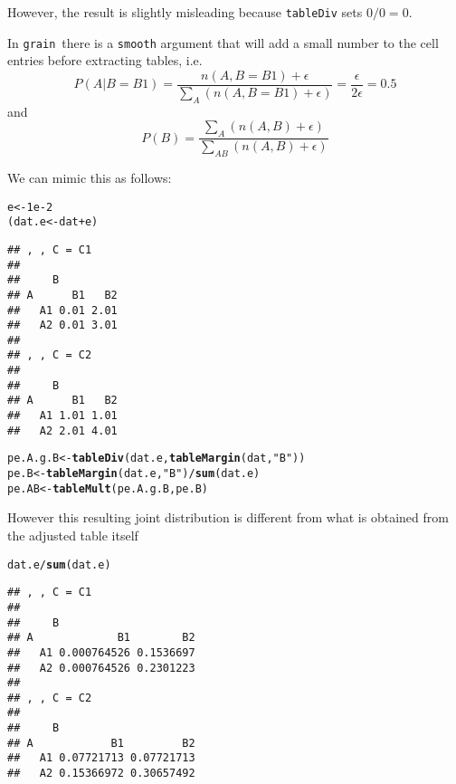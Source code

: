 \documentclass[10pt]{article}\usepackage[]{graphicx}\usepackage[]{color}
\makeatletter
\newcommand{\hlnum}[1]{\textcolor[rgb]{0.686,0.059,0.569}{#1}}%
\newcommand{\hlstr}[1]{\textcolor[rgb]{0.192,0.494,0.8}{#1}}%
\newcommand{\hlopt}[1]{\textcolor[rgb]{0,0,0}{#1}}%
\newcommand{\hlstd}[1]{\textcolor[rgb]{0.345,0.345,0.345}{#1}}%
\newcommand{\hlkwb}[1]{\textcolor[rgb]{0.69,0.353,0.396}{#1}}%
\newcommand{\hlkwd}[1]{\textcolor[rgb]{0.737,0.353,0.396}{\textbf{#1}}}%
\newenvironment{kframe}{%
 \def\at@end@of@kframe{}%
 \ifinner\ifhmode%
  \def\at@end@of@kframe{\end{minipage}}%
  \begin{minipage}{\columnwidth}%
 \fi\fi%
 \def\FrameCommand##1{\hskip\@totalleftmargin \hskip-\fboxsep
 \colorbox{shadecolor}{##1}\hskip-\fboxsep
     \hskip-\linewidth \hskip-\@totalleftmargin \hskip\columnwidth}%
 \MakeFramed {\advance\hsize-\width
   \@totalleftmargin\z@ \linewidth\hsize
   \@setminipage}}%
 {\par\unskip\endMakeFramed%
 \at@end@of@kframe}
\newenvironment{knitrout}{}{} %
\def\grain{\texttt{grain}}
\def\code#1{{\texttt{#1}}}
\makeatother
\begin{document}
However, the result is slightly misleading because \code{tableDiv}
sets $0/0=0$.

In \grain\ there is a \code{smooth} argument that will add a small
number to the cell entries before extracting tables, i.e.
\begin{displaymath}
  P(A|B=B1)=\frac{n(A,B=B1)+\epsilon}{\sum_A ( n(A,B=B1) + \epsilon) }
  = \frac{\epsilon}{2\epsilon} = 0.5
\end{displaymath}
and
\begin{displaymath}
  P(B)= \frac{\sum_A (n(A,B)+\epsilon)}{\sum_{AB} (n(A,B)+\epsilon)}
\end{displaymath}

We can mimic this as follows:
\begin{knitrout}
\color{fgcolor}\begin{kframe}
\begin{alltt}
\hlstd{e} \hlkwb{<-} \hlnum{1e-2}
\hlstd{(dat.e} \hlkwb{<-} \hlstd{dat} \hlopt{+} \hlstd{e)}
\end{alltt}
\begin{verbatim}
## , , C = C1
## 
##     B
## A      B1   B2
##   A1 0.01 2.01
##   A2 0.01 3.01
## 
## , , C = C2
## 
##     B
## A      B1   B2
##   A1 1.01 1.01
##   A2 2.01 4.01
\end{verbatim}
\end{kframe}
\end{knitrout}

\begin{knitrout}
\color{fgcolor}\begin{kframe}
\begin{alltt}
\hlstd{pe.A.g.B} \hlkwb{<-} \hlkwd{tableDiv}\hlstd{(dat.e,} \hlkwd{tableMargin}\hlstd{(dat,} \hlstr{"B"}\hlstd{))}
\hlstd{pe.B} \hlkwb{<-} \hlkwd{tableMargin}\hlstd{(dat.e,} \hlstr{"B"}\hlstd{)}\hlopt{/}\hlkwd{sum}\hlstd{(dat.e)}
\hlstd{pe.AB}  \hlkwb{<-} \hlkwd{tableMult}\hlstd{( pe.A.g.B, pe.B )}
\end{alltt}
\end{kframe}
\end{knitrout}

However this resulting joint distribution is different from what is
obtained from the adjusted table itself
\begin{knitrout}
\color{fgcolor}\begin{kframe}
\begin{alltt}
\hlstd{dat.e} \hlopt{/} \hlkwd{sum}\hlstd{(dat.e)}
\end{alltt}
\begin{verbatim}
## , , C = C1
## 
##     B
## A             B1        B2
##   A1 0.000764526 0.1536697
##   A2 0.000764526 0.2301223
## 
## , , C = C2
## 
##     B
## A            B1         B2
##   A1 0.07721713 0.07721713
##   A2 0.15366972 0.30657492
\end{verbatim}
\end{kframe}
\end{knitrout}
\end{document}
